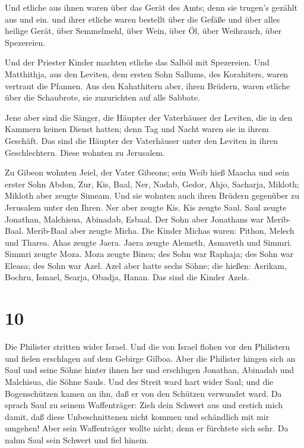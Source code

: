  Und etliche aus ihnen waren über das Gerät des Amts; denn
sie trugen's gezählt aus und ein.  und ihrer etliche waren
bestellt über die Gefäße und über alles heilige Gerät, über Semmelmehl,
über Wein, über Öl, über Weihrauch, über Spezereien.

 Und der Priester Kinder machten etliche das Salböl mit
Spezereien.  Und Matthithja, aus den Leviten, dem ersten
Sohn Sallums, des Korahiters, waren vertraut die Pfannen. 
Aus den Kahathitern aber, ihren Brüdern, waren etliche über die
Schaubrote, sie zuzurichten auf alle Sabbate.

 Jene aber sind die Sänger, die Häupter der Vaterhäuser der
Leviten, die in den Kammern keinen Dienst hatten; denn Tag und Nacht
waren sie in ihrem Geschäft.  Das sind die Häupter der
Vaterhäuser unter den Leviten in ihren Geschlechtern. Diese wohnten zu
Jerusalem.

 Zu Gibeon wohnten Jeiel, der Vater Gibeons; sein Weib hieß
Maacha  und sein erster Sohn Abdon, Zur, Kis, Baal, Ner,
Nadab,  Gedor, Ahjo, Sacharja, Mikloth; 
Mikloth aber zeugte Simeam. Und sie wohnten auch ihren Brüdern gegenüber
zu Jerusalem unter den Ihren.  Ner aber zeugte Kis. Kis
zeugte Saul. Saul zeugte Jonathan, Malchisua, Abinadab, Esbaal.
 Der Sohn aber Jonathans war Merib-Baal. Merib-Baal aber
zeugte Micha.  Die Kinder Michas waren: Pithon, Melech und
Tharea.  Ahas zeugte Jaera. Jaera zeugte Alemeth, Asmaveth
und Simmri. Simmri zeugte Moza.  Moza zeugte Binea; des
Sohn war Raphaja; des Sohn war Eleasa; des Sohn war Azel. 
Azel aber hatte sechs Söhne; die hießen: Asrikam, Bochru, Ismael,
Searja, Obadja, Hanan. Das sind die Kinder Azels.

\hypertarget{section-9}{%
\section{10}\label{section-9}}

 Die Philister stritten wider Israel. Und die von Israel
flohen vor den Philistern und fielen erschlagen auf dem Gebirge Gilboa.
 Aber die Philister hingen sich an Saul und seine Söhne
hinter ihnen her und erschlugen Jonathan, Abinadab und Malchisua, die
Söhne Sauls.  Und des Streit ward hart wider Saul; und die
Bogenschützen kamen an ihn, daß er von den Schützen verwundet ward.
 Da sprach Saul zu seinem Waffenträger: Zieh dein Schwert
aus und erstich mich damit, daß diese Unbeschnittenen nicht kommen und
schändlich mit mir umgehen! Aber sein Waffenträger wollte nicht; denn er
fürchtete sich sehr. Da nahm Saul sein Schwert und fiel hinein.

